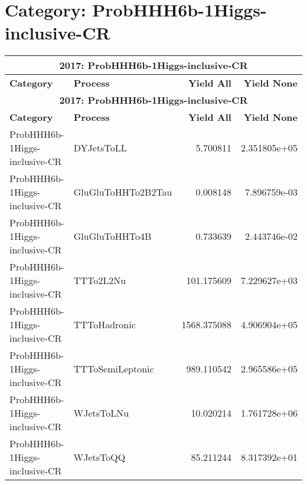 \documentclass{article}
\begin{document}
\section*{Category: ProbHHH6b-1Higgs-inclusive-CR}
\begin{longtable}[c]{|l|l|r|r|}
\hline
\multicolumn{4}{|c|}{\textbf{2017: ProbHHH6b-1Higgs-inclusive-CR}} \\
\hline
\textbf{Category} & \textbf{Process} & \textbf{Yield All} & \textbf{Yield None} \\
\hline
\endfirsthead
\hline
\multicolumn{4}{|c|}{\textbf{2017: ProbHHH6b-1Higgs-inclusive-CR}} \\
\hline
\textbf{Category} & \textbf{Process} & \textbf{Yield All} & \textbf{Yield None} \\
\hline
\endhead
ProbHHH6b-1Higgs-inclusive-CR & DYJetsToLL & 5.700811 & 2.351805e+05 \\
\hline
ProbHHH6b-1Higgs-inclusive-CR & GluGluToHHTo2B2Tau & 0.008148 & 7.896759e-03 \\
\hline
ProbHHH6b-1Higgs-inclusive-CR & GluGluToHHTo4B & 0.733639 & 2.443746e-02 \\
\hline
ProbHHH6b-1Higgs-inclusive-CR & TTTo2L2Nu & 101.175609 & 7.229627e+03 \\
\hline
ProbHHH6b-1Higgs-inclusive-CR & TTToHadronic & 1568.375088 & 4.906904e+05 \\
\hline
ProbHHH6b-1Higgs-inclusive-CR & TTToSemiLeptonic & 989.110542 & 2.965586e+05 \\
\hline
ProbHHH6b-1Higgs-inclusive-CR & WJetsToLNu & 10.020214 & 1.761728e+06 \\
\hline
ProbHHH6b-1Higgs-inclusive-CR & WJetsToQQ & 85.211244 & 8.317392e+01 \\
\hline
\end{longtable}
\end{document}
